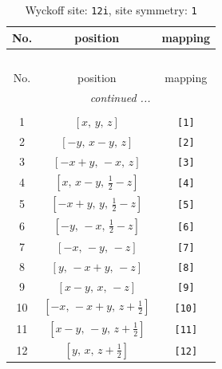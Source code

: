 \documentclass[fleqn,8pt]{jsarticle}
\begin{document}
\renewcommand{\arraystretch}{1.2}
\begin{longtable}{ccc}
\caption{Wyckoff site: {\tt 12i}, site symmetry: {\tt 1}}
 \\
 \hline \hline
No. & position & mapping \\ \hline \endfirsthead

\multicolumn{2}{l}{\tablename\ \thetable{}} \\
 \hline \hline
No. & position & mapping \\ \hline \endhead

 \hline \hline
\multicolumn{2}{r}{\footnotesize\it continued ...} \\ \endfoot

 \hline \hline
\multicolumn{2}{r}{} \\ \endlastfoot

1 & $\left[ x,\, y,\, z \right]$ & {\tt [1]} \\ \hline
2 & $\left[ - y,\, x - y,\, z \right]$ & {\tt [2]} \\ \hline
3 & $\left[ - x + y,\, - x,\, z \right]$ & {\tt [3]} \\ \hline
4 & $\left[ x,\, x - y,\, \frac{1}{2} - z \right]$ & {\tt [4]} \\ \hline
5 & $\left[ - x + y,\, y,\, \frac{1}{2} - z \right]$ & {\tt [5]} \\ \hline
6 & $\left[ - y,\, - x,\, \frac{1}{2} - z \right]$ & {\tt [6]} \\ \hline
7 & $\left[ - x,\, - y,\, - z \right]$ & {\tt [7]} \\ \hline
8 & $\left[ y,\, - x + y,\, - z \right]$ & {\tt [8]} \\ \hline
9 & $\left[ x - y,\, x,\, - z \right]$ & {\tt [9]} \\ \hline
10 & $\left[ - x,\, - x + y,\, z + \frac{1}{2} \right]$ & {\tt [10]} \\ \hline
11 & $\left[ x - y,\, - y,\, z + \frac{1}{2} \right]$ & {\tt [11]} \\ \hline
12 & $\left[ y,\, x,\, z + \frac{1}{2} \right]$ & {\tt [12]} \\
\end{longtable}
\end{document}
